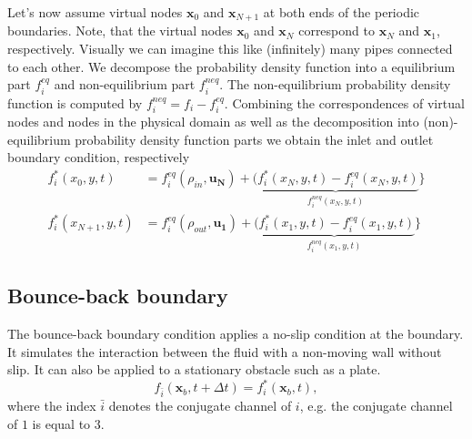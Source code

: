 \documentclass[a4paper,11pt, footsepline]{book}
\begin{document}
Let's now assume virtual nodes $\mathbf{x}_{0}$ and $\mathbf{x}_{N+1}$ at both ends of the periodic boundaries. Note, that the virtual nodes $\mathbf{x}_{0}$ and $\mathbf{x}_{N}$ correspond to $\mathbf{x}_{N}$ and $\mathbf{x}_{1}$, respectively. Visually we can imagine this like (infinitely) many pipes connected to each other. We decompose the probability density function into a equilibrium part $f_{i}^{eq}$ and non-equilibrium part $f_{i}^{neq}$. The non-equilibrium probability density function is computed by $f_{i}^{neq}=f_{i}-f_{i}^{eq}$. Combining the correspondences of virtual nodes and nodes in the physical domain as well as the decomposition into (non)-equilibrium probability density function parts we obtain the inlet and outlet boundary condition, respectively
\begin{align}
f_{i}^{\ast}(x_0,y,t)&=f_{i}^{eq}(\rho_{in},\mathbf{u_N})+\underbrace{(f_{i}^{\ast}(x_N,y,t)-f_{i}^{eq}(x_N,y,t)}_{f_i^{neq}(x_N,y,t)}\rbrace\\
f_{i}^{\ast}(x_{N+1},y,t)&=f_{i}^{eq}(\rho_{out},\mathbf{u_1})+\underbrace{(f_{i}^{\ast}(x_1,y,t)-f_{i}^{eq}(x_1,y,t)}_{f_i^{neq}(x_1,y,t)}\rbrace
\end{align}
\subsection*{Bounce-back boundary}
The bounce-back boundary condition applies a no-slip condition at the boundary. It simulates the interaction between the fluid with a non-moving wall without slip. It can also be applied to a stationary obstacle such as a plate.
\begin{equation}
f_{\bar{i}}(\mathbf{x}_{b},t+\Delta t)=f_{i}^{\ast}(\mathbf{x}_{b},t),
\end{equation}
where the index $\bar{i}$ denotes the conjugate channel of $i$, e.g. the conjugate channel of $1$ is equal to $3$.
\end{document}
